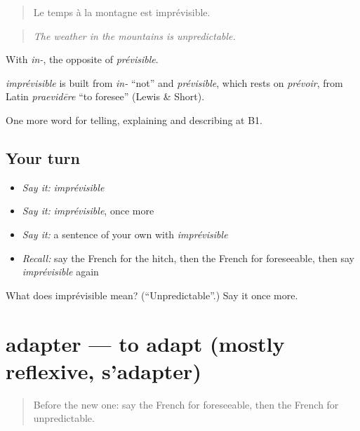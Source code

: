 \begin{quote}
Le temps à la montagne est imprévisible.
\end{quote}

\begin{quote}
\emph{The weather in the mountains is unpredictable.}
\end{quote}

With \emph{in-}, the opposite of \emph{prévisible}.

\begin{cousinweb}
\emph{imprévisible} is built from \emph{in-} \textquotedblleft{}not\textquotedblright{} and \emph{prévisible}, which rests on \emph{prévoir}, from Latin \emph{praevidēre} \textquotedblleft{}to foresee\textquotedblright{} (Lewis \& Short).
\end{cousinweb}

\begin{grammarlens}[title={What you've built}]
One more word for telling, explaining and describing at B1.
\end{grammarlens}

\subsection*{Your turn}
\begin{itemize}
\raggedright
  \item \emph{Say it:} \emph{imprévisible}
  \item \emph{Say it:} \emph{imprévisible}, once more
  \item \emph{Say it:} a sentence of your own with \emph{imprévisible}
  \item \emph{Recall:} say the French for the hitch, then the French for foreseeable, then say \emph{imprévisible} again
\end{itemize}

\begin{tcolorbox}[breakable,colback=teal!4,colframe=teal!35!black,title={Before you move on}]
What does imprévisible mean? (\textquotedblleft{}Unpredictable\textquotedblright{}.) Say it once more.
\end{tcolorbox}
\section[adapter]{adapter — to adapt (mostly reflexive, s'adapter)}

\label{lesson:FR-C370-adapter}



\begin{quote}
Before the new one: say the French for foreseeable, then the French for unpredictable.
\end{quote}

